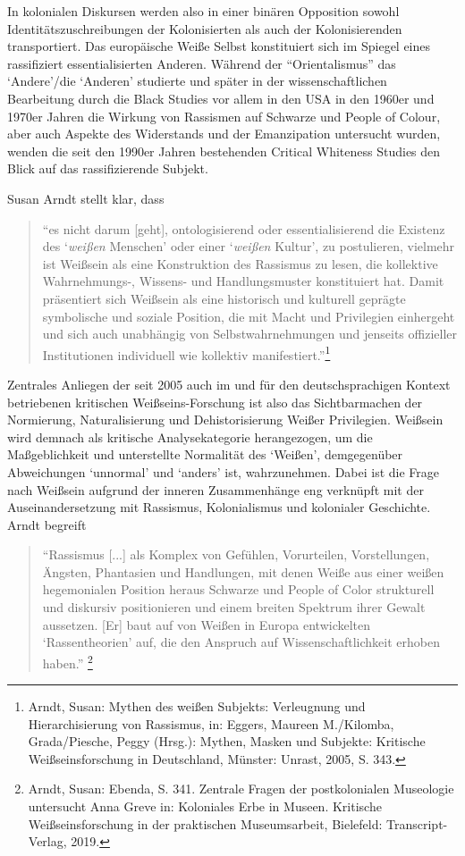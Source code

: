 \documentclass[a4paper,
fontsize=11pt,
oneside,
numbers=noperiodatend,
parskip=half-,
bibliography=totoc,
final
]{scrartcl}
\begin{document}
In kolonialen Diskursen werden also in einer binären Opposition sowohl
Identitätszuschreibungen der Kolonisierten als auch der Kolonisierenden
transportiert. Das europäische Weiße Selbst konstituiert sich im Spiegel
eines rassifiziert essentialisierten Anderen. Während der
\enquote{Orientalismus} das \enquote*{Andere}/die \enquote*{Anderen}
studierte und später in der wissenschaftlichen Bearbeitung durch die
Black Studies vor allem in den USA in den 1960er und 1970er Jahren die
Wirkung von Rassismen auf Schwarze und People of Colour, aber auch
Aspekte des Widerstands und der Emanzipation untersucht wurden, wenden
die seit den 1990er Jahren bestehenden Critical Whiteness Studies den
Blick auf das rassifizierende Subjekt.

Susan Arndt stellt klar, dass

\begin{quote}
\enquote{es nicht darum {[}geht{]}, ontologisierend oder
essentialisierend die Existenz des \enquote*{\emph{weißen} Menschen}
oder einer \enquote*{\emph{weißen} Kultur}, zu postulieren, vielmehr ist
Weißsein als eine Konstruktion des Rassismus zu lesen, die kollektive
Wahrnehmungs-, Wissens- und Handlungsmuster konstituiert hat. Damit
präsentiert sich Weißsein als eine historisch und kulturell geprägte
symbolische und soziale Position, die mit Macht und Privilegien
einhergeht und sich auch unabhängig von Selbstwahrnehmungen und jenseits
offizieller Institutionen individuell wie kollektiv
manifestiert.}\footnote{Arndt, Susan: Mythen des weißen Subjekts:
  Verleugnung und Hierarchisierung von Rassismus, in: Eggers, Maureen
  M./Kilomba, Grada/Piesche, Peggy (Hrsg.): Mythen, Masken und Subjekte:
  Kritische Weißseinsforschung in Deutschland, Münster: Unrast, 2005, S.
  343.}
\end{quote}

Zentrales Anliegen der seit 2005 auch im und für den deutschsprachigen
Kontext betriebenen kritischen Weißseins-Forschung ist also das
Sichtbarmachen der Normierung, Naturalisierung und Dehistorisierung
Weißer Privilegien. Weißsein wird demnach als kritische Analysekategorie
herangezogen, um die Maßgeblichkeit und unterstellte Normalität des
\enquote*{Weißen}, demgegenüber Abweichungen \enquote*{unnormal} und
\enquote*{anders} ist, wahrzunehmen. Dabei ist die Frage nach Weißsein
aufgrund der inneren Zusammenhänge eng verknüpft mit der
Auseinandersetzung mit Rassismus, Kolonialismus und kolonialer
Geschichte. Arndt begreift

\begin{quote}
\enquote{Rassismus {[}...{]} als Komplex von Gefühlen, Vorurteilen,
Vorstellungen, Ängsten, Phantasien und Handlungen, mit denen Weiße aus
einer weißen hegemonialen Position heraus Schwarze und People of Color
strukturell und diskursiv positionieren und einem breiten Spektrum ihrer
Gewalt aussetzen. {[}Er{]} baut auf von Weißen in Europa entwickelten
\enquote*{Rassentheorien} auf, die den Anspruch auf Wissenschaftlichkeit
erhoben haben.} \footnote{Arndt, Susan: Ebenda, S. 341. Zentrale Fragen
  der postkolonialen Museologie untersucht Anna Greve in: Koloniales
  Erbe in Museen. Kritische Weißseinsforschung in der praktischen
  Museumsarbeit, Bielefeld: Transcript-Verlag, 2019.}
\end{quote}
\end{document}
